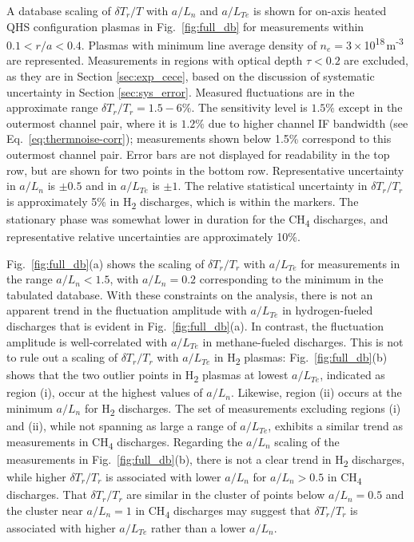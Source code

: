 \documentclass[%
 aip,
 amsmath,amssymb,
 reprint,%
]{revtex4-1}
\begin{document}
A database scaling of $\delta T_r /T$ with $a/L_n$ and $a/L_{Te}$ is shown for on-axis heated QHS configuration plasmas in Fig.\ \ref{fig:full_db} for measurements within $0.1<r/a<0.4$. Plasmas with minimum line average density of $n_e=3\times$10\textsuperscript{18}\,m\textsuperscript{-3} are represented. Measurements in regions with optical depth $\tau<0.2$ are excluded, as they are in Section \ref{sec:exp_cece}, based on the discussion of systematic uncertainty in Section \ref{sec:sys_error}. Measured fluctuations are in the approximate range $\delta T_r /T_r = 1.5 - 6\%$. The sensitivity level is $1.5\%$ except in the outermost channel pair, where it is $1.2\%$ due to higher channel IF bandwidth (see Eq.\ \eqref{eq:thermnoise-corr}); measurements shown below 1.5\% correspond to this outermost channel pair. Error bars are not displayed for readability in the top row, but are shown for two points in the bottom row. Representative uncertainty in $a/L_n$ is $\pm0.5$ and in $a/L_{Te}$ is $\pm1$. The relative statistical uncertainty in $\delta T_r/T_r$ is approximately 5\% in H\textsubscript{2} discharges, which is within the markers. The stationary phase was somewhat lower in duration for the CH\textsubscript{4} discharges, and representative relative uncertainties are approximately 10\%.

Fig.\ \ref{fig:full_db}(a) shows the scaling of $\delta T_r/T_r$ with $a/L_{Te}$ for measurements in the range $a/L_n < 1.5$, with $a/L_n=0.2$ corresponding to the minimum in the tabulated database. With these constraints on the analysis, there is not an apparent trend in the fluctuation amplitude with $a/L_{Te}$ in hydrogen-fueled discharges that is evident in Fig.\ \ref{fig:full_db}(a). In contrast, the fluctuation amplitude is well-correlated with $a/L_{Te}$ in methane-fueled discharges. This is not to rule out a scaling of $\delta T_r/T_r$  with $a/L_{Te}$ in H\textsubscript{2} plasmas: Fig.\ \ref{fig:full_db}(b) shows that the two outlier points in H\textsubscript{2} plasmas at lowest $a/L_{Te}$, indicated as region (i), occur at the highest values of $a/L_n$. Likewise, region (ii) occurs at the minimum $a/L_n$ for H\textsubscript{2} discharges. The set of measurements excluding regions (i) and (ii), while not spanning as large a range of $a/L_{Te}$, exhibits a similar trend as measurements in CH\textsubscript{4} discharges. Regarding the $a/L_n$ scaling of the measurements in Fig.\ \ref{fig:full_db}(b), there is not a clear trend in H\textsubscript{2} discharges, while higher $\delta T_r/T_r$ is associated with lower $a/L_n$ for $a/L_n > 0.5$ in CH\textsubscript{4} discharges. That $\delta T_r/T_r$ are similar in the cluster of points below $a/L_n=0.5$ and the cluster near $a/L_n=1$  in CH\textsubscript{4} discharges may suggest that $\delta T_r/T_r$ is associated with higher $a/L_{Te}$ rather than a lower $a/L_n$.
\end{document}

